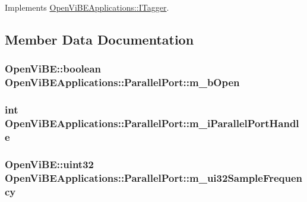 Implements \hyperlink{classOpenViBEApplications_1_1ITagger_a986aae0747ce120c9fa789bda4ff0178}{OpenViBEApplications::ITagger}.



\subsection{Member Data Documentation}
\hypertarget{classOpenViBEApplications_1_1ParallelPort_abd6f1e37f308f7346f7bd65a739b3e87}{
\subsubsection[{m\_\-bOpen}]{\setlength{\rightskip}{0pt plus 5cm}OpenViBE::boolean {\bf OpenViBEApplications::ParallelPort::m\_\-bOpen}}}
\label{classOpenViBEApplications_1_1ParallelPort_abd6f1e37f308f7346f7bd65a739b3e87}
\hypertarget{classOpenViBEApplications_1_1ParallelPort_a3b79e4aa348b21aa1f35e368dd34d9e3}{
\subsubsection[{m\_\-iParallelPortHandle}]{\setlength{\rightskip}{0pt plus 5cm}int {\bf OpenViBEApplications::ParallelPort::m\_\-iParallelPortHandle}}}
\label{classOpenViBEApplications_1_1ParallelPort_a3b79e4aa348b21aa1f35e368dd34d9e3}
\hypertarget{classOpenViBEApplications_1_1ParallelPort_a7a1f4b171c0d5151349eeddab4e0f985}{
\subsubsection[{m\_\-ui32SampleFrequency}]{\setlength{\rightskip}{0pt plus 5cm}OpenViBE::uint32 {\bf OpenViBEApplications::ParallelPort::m\_\-ui32SampleFrequency}}}
